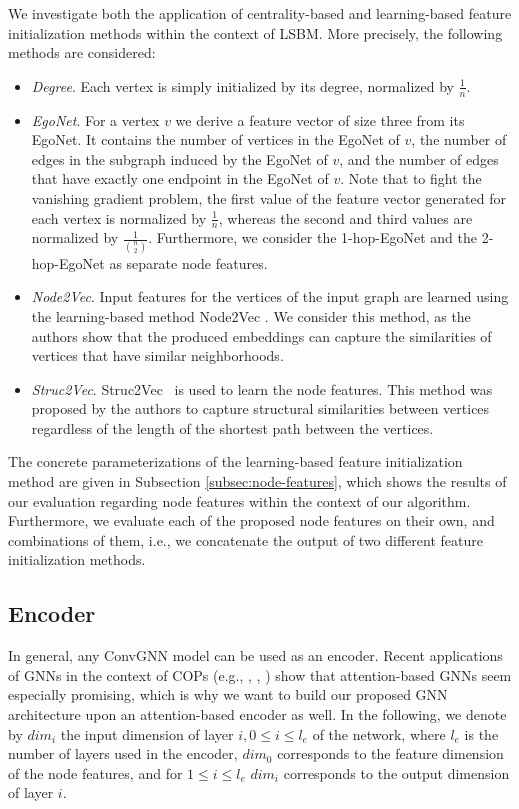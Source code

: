 \documentclass[draft,final]{vutinfth} %
\begin{document}
We investigate both the application of centrality-based and learning-based feature initialization methods within the context of LSBM. 
More precisely, the following methods are considered: 
\begin{itemize}
    \item \emph{Degree}. Each vertex is simply initialized by its degree, normalized by $\frac{1}{n}$. 
    \item \emph{EgoNet}. For a vertex $v$ we derive a feature vector of size three from its EgoNet. It contains the number of vertices in the EgoNet of $v$, the number of edges in the subgraph induced by the EgoNet of $v$, and the number of edges that have exactly one endpoint in the EgoNet of $v$. 
    Note that to fight the vanishing gradient problem, the first value of the feature vector generated for each vertex is normalized by $\frac{1}{n}$, whereas the second and third values are normalized by $\frac{1}{\binom{n}{2}}$. 
    Furthermore, we consider the 1-hop-EgoNet and the 2-hop-EgoNet as separate node features. 
    \item \emph{Node2Vec}. Input features for the vertices of the input graph are learned using the learning-based method Node2Vec \cite{GroverL16}. We consider this method, as the authors show that the produced embeddings can capture the similarities of vertices that have similar neighborhoods. 
    \item \emph{Struc2Vec}. Struc2Vec~\cite{FigueiredoRS17} is used to learn the node features. This method was proposed by the authors to capture structural similarities between vertices regardless of the length of the shortest path between the vertices.  
\end{itemize}
The concrete parameterizations of the learning-based feature initialization method are given in Subsection \ref{subsec:node-features}, which shows the results of our evaluation regarding node features within the context of our algorithm. Furthermore, we evaluate each of the proposed node features on their own, and combinations of them, i.e., we concatenate the output of two different feature initialization methods. 

\subsection{Encoder}
In general, any ConvGNN model can be used as an encoder. Recent applications of GNNs in the context of COPs (e.g., \cite{Kool2019}, \cite{Joshi2021}, \cite{Hudson2021}) show that attention-based GNNs seem especially promising, which is why we want to build our proposed GNN architecture upon an attention-based encoder as well. 
In the following, we denote by $\mathit{dim}_i$ the input dimension of layer $i, 0 \leq i \leq l_e$ of the network, where $l_e$ is the number of layers used in the encoder, $dim_0$ corresponds to the feature dimension of the node features, and for $1 \leq i \leq l_e$ $\mathit{dim}_i$ corresponds to the output dimension of layer $i$. 
\end{document}
